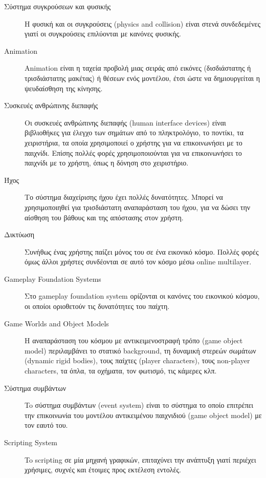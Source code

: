 \begin{description}
\item [Σύστημα συγκρούσεων και φυσικής]Η φυσική και οι συγκρούσεις (physics and collision) είναι στενά συνδεδεμένες γιατί οι συγκρούσεις επιλύονται με κανόνες φυσικής.

\item [Animation]Animation είναι η ταχεία προβολή μιας σειράς από εικόνες (δισδιάστατης ή τρισδιάστατης μακέτας) ή θέσεων ενός μοντέλου, έτσι ώστε να δημιουργείται η ψευδαίσθηση της κίνησης.

\item [Συσκευές ανθρώπινης διεπαφής]Οι συσκευές ανθρώπινης διεπαφής (human interface devices) είναι βιβλιοθήκες για έλεγχο των σημάτων από το πληκτρολόγιο, το ποντίκι, τα χειριστήρια, τα οποία χρησιμοποιεί ο χρήστης για να επικοινωνήσει με το παιχνίδι. Επίσης πολλές φορές χρησιμοποιούνται για να επικοινωνήσει το παιχνίδι με το χρήστη, όπως η δόνηση στο χειριστήριο.

\item [Ήχος]Το σύστημα διαχείρισης ήχου έχει πολλές δυνατότητες. Μπορεί να χρησιμοποιηθεί για τρισδιάστατη αναπαράσταση του ήχου, για να δώσει την αίσθηση του βάθους και της απόστασης στον χρήστη.

\item [Δικτύωση]Συνήθως ένας χρήστης παίζει μόνος του σε ένα εικονικό κόσμο. Πολλές φορές όμως άλλοι χρήστες συνδέονται σε αυτό τον κόσμο μέσω online multilayer.

\item [Gameplay Foundation Systems]Στο gameplay foundation system ορίζονται οι κανόνες του εικονικού κόσμου, οι οποίοι οριοθετούν τις δυνατότητες του παίχτη.

\item [Game Worlds and Object Models]Η αναπαράσταση του κόσμου με αντικειμενοστραφή τρόπο (game object model) περιλαμβάνει το στατικό background, τη δυναμική στερεών σωμάτων (dynamic rigid bodies), τους παίχτες (player characters), τους non-player characters, τα όπλα, τα οχήματα, τον φωτισμό, τις κάμερες κλπ.

\item [Σύστημα συμβάντων]To σύστημα συμβάντων (event system) είναι το σύστημα το οποίο επιτρέπει την επικοινωνία του μοντέλου αντικειμένου παιχνιδιού (game object model) με τον εαυτό του.

\item [Scripting System]To scripting σε μία μηχανή γραφικών, επιταχύνει την ανάπτυξη γιατί περιέχει χρήσιμες, συχνές και έτοιμες προς εκτέλεση εντολές.


\end{description}
